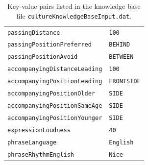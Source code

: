 \documentclass{CSSRforAfrica}
\begin{document}
\begin{table}[H]
\caption{Key-value pairs listed in the knowledge base file  {\tt \small cultureKnowledgeBaseInput.dat}.}
\label{fig:cultureKnowledgeBase1}
\vspace{-3mm}
\begin{tabular}{l l}
{\footnotesize \verb+passingDistance+} 	                                     & {\footnotesize \verb+100+} \vspace{-1.5mm} \\
{\footnotesize \verb+passingPositionPreferred+} 	                             & {\footnotesize \verb+BEHIND+ } \vspace{-1.5mm}\\
{\footnotesize \verb+passingPositionAvoid+}                                     & {\footnotesize \verb+BETWEEN+} \vspace{-1.5mm}\\ 
{\footnotesize \verb+accompanyingDistanceLeading+}                      & {\footnotesize \verb+100+} \vspace{-1.5mm} \\
{\footnotesize \verb+accompanyingPositionLeading+} 	                     & {\footnotesize \verb+FRONTSIDE+} \vspace{-1.5mm}\\
{\footnotesize \verb+accompanyingPositionOlder+} 	                     & {\footnotesize \verb+SIDE+} \vspace{-1.5mm}  \\
{\footnotesize \verb+accompanyingPositionSameAge+}                     & {\footnotesize \verb+SIDE+} \vspace{-1.5mm} \\
{\footnotesize \verb+accompanyingPositionYounger+}                      & {\footnotesize \verb+SIDE+}  \vspace{-1.5mm} \\
{\footnotesize \verb+expressionLoudness+}                                      & {\footnotesize \verb+40+ } \vspace{-1.5mm} \\
{\footnotesize \verb+phraseLanguage+}                                            & {\footnotesize \verb+English+} \vspace{-1.5mm}  \\
{\footnotesize \verb+phraseRhythmEnglish+}                                   & {\footnotesize \verb+Nice+}\vspace{-1.5mm} \\

\end{tabular}
\end{table}
\end{document}
